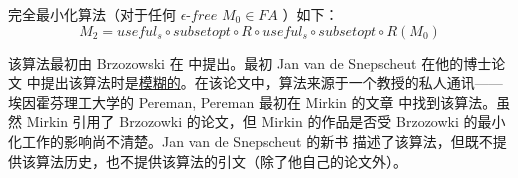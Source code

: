 完全最小化算法（对于任何 $\epsilon$-$free$ $M_0\in FA$ ）如下：
$$  M_2 = useful_s \circ subsetopt \circ R \circ useful_s \circ subsetopt \circ R(M_0) $$

该算法最初由 Brzozowski 在 \cite{Brzo62} 中提出。最初 Jan van de Snepscheut 在他的博士论文 \cite{vdSn85}中提出该算法时是\uline{模糊的}。在该论文中，算法来源于一个教授的私人通讯——埃因霍芬理工大学的 Pereman, Pereman 最初在 Mirkin 的文章 \cite{Mirk65} 中找到该算法。虽然 Mirkin 引用了 Brzozowki \cite{Brzo64} 的论文，但 Mirkin 的作品是否受 Brzozowki 的最小化工作的影响尚不清楚。Jan van de Snepscheut 的新书\cite{VDSn93} 描述了该算法，但既不提供该算法历史，也不提供该算法的引文（除了他自己的论文外）。
